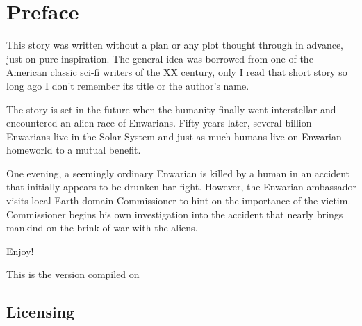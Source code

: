 \chapter*{Preface}


This story was written without a plan or any plot thought through in advance, just on pure inspiration. The general idea was borrowed from one of the American classic sci-fi writers of the XX century, only I read that short story so long ago I don't remember its title or the author's name.

The story is set in the future when the humanity finally went interstellar and encountered an alien race of Enwarians. Fifty years later, several billion Enwarians live in the Solar System and just as much humans live on Enwarian homeworld to a mutual benefit.

One evening, a seemingly ordinary Enwarian is killed by a human in an accident that initially appears to be drunken bar fight. However, the Enwarian ambassador visits local Earth domain Commissioner to hint on the importance of the victim. Commissioner begins his own investigation into the accident that nearly brings mankind on the brink of war with the aliens.


Enjoy!


This is the version compiled on \DTMToday\ \DTMcurrenttime

\section*{Licensing}

\pdforepub{
	
\doclicenseThis

\hspace*{\fill} \qrcode[nolink,level=L,height=3cm]{\doclicenseURL}

}{\doclicenseLongText}